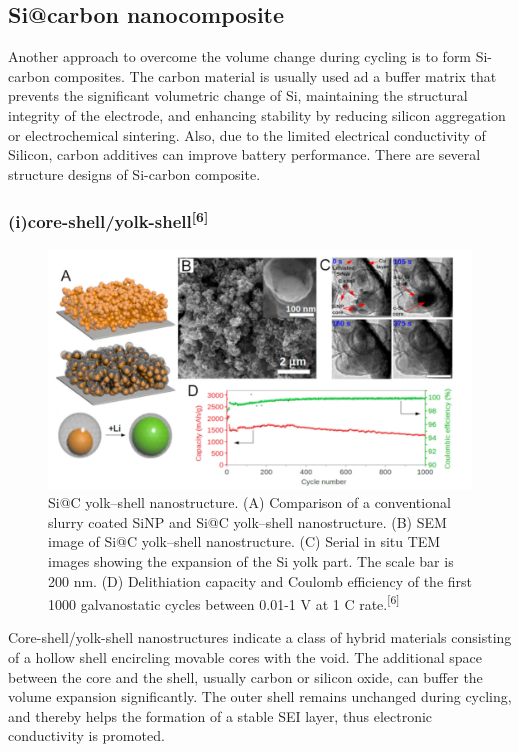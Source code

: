 \subsection{Si@carbon nanocomposite}%
Another approach to overcome the volume change during cycling is to form Si-carbon composites. The carbon material is usually used ad a buffer matrix that prevents the significant volumetric change of Si, maintaining the structural integrity of the electrode, and enhancing stability by reducing silicon aggregation or electrochemical sintering. Also, due to the limited electrical conductivity of Silicon, carbon additives can improve battery performance. There are several structure designs of Si-carbon composite.
\subsubsection{(i)core-shell/yolk-shell\textsuperscript{[6]} }
\begin{figure}[H]
\centering
\includegraphics[width=14cm]{src/fig/fig7.png}
\caption{Si@C yolk–shell nanostructure. (A) Comparison of a conventional slurry coated SiNP and Si@C yolk–shell nanostructure. (B) SEM image of Si@C yolk–shell nanostructure. (C) Serial in situ TEM images showing the expansion of the Si yolk part. The scale bar is 200 nm. (D) Delithiation capacity and Coulomb eﬃciency of the ﬁrst 1000 galvanostatic cycles between 0.01-1 V at 1 C rate.\textsuperscript{[6]} }
\end{figure}
Core-shell/yolk-shell nanostructures indicate a class of hybrid materials consisting of a hollow shell encircling movable cores with the void. The additional space between the core and the shell, usually carbon or silicon oxide, can buffer the volume expansion significantly. The outer shell remains unchanged during cycling, and thereby helps the formation of a stable SEI layer, thus electronic conductivity is promoted.
